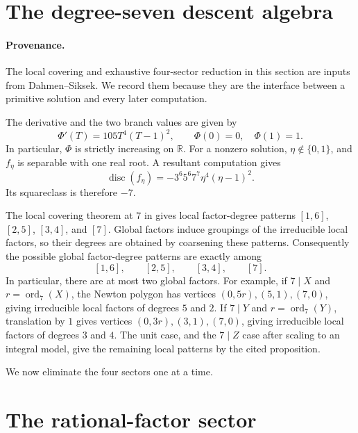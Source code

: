 \documentclass[11pt]{article}
\newcommand{\ord}{\operatorname{ord}}
\newcommand{\disc}{\operatorname{disc}}
\theoremstyle{definition}
\theoremstyle{remark}
\begin{document}
\section{The degree-seven descent algebra}\label{sec:descent}

\paragraph{Provenance.}
The local covering and exhaustive four-sector reduction in this section are
inputs from Dahmen--Siksek.  We record them because they are the
interface between a primitive solution and every later computation.

The derivative and the two branch values are given by
\begin{equation}\label{eq:derivative}
          \Phi'(T)=105T^4(T-1)^2,
          \qquad \Phi(0)=0,\quad \Phi(1)=1.
\end{equation}
In particular, $\Phi$ is strictly increasing on $\mathbb R$.  For a
nonzero solution, $\eta\notin\{0,1\}$, and $f_\eta$ is separable with one
real root.  A resultant computation gives
\begin{equation}\label{eq:discriminant}
 \disc(f_\eta)
   =-3^6 5^6 7^7\eta^4(\eta-1)^2.
\end{equation}
Its squareclass is therefore $-7$.

The local covering theorem at $7$ in \cite[Proposition~3.5]{DahmenSiksek}
gives local factor-degree patterns $[1,6]$, $[2,5]$, $[3,4]$, and $[7]$.
Global factors induce groupings of the irreducible local factors, so their
degrees are obtained by coarsening these patterns.  Consequently the
possible global factor-degree patterns are exactly among
\begin{equation}\label{eq:four-sectors}
                  [1,6],\qquad [2,5],\qquad [3,4],\qquad [7].
\end{equation}
In particular, there are at most two global factors.  For example, if
$7\mid X$ and $r=\ord_7(X)$, the Newton polygon has vertices
$(0,5r),(5,1),(7,0)$, giving irreducible local factors of degrees $5$ and $2$.
If $7\mid Y$ and $r=\ord_7(Y)$, translation by $1$ gives vertices
$(0,3r),(3,1),(7,0)$, giving irreducible local factors of degrees $3$ and $4$.
The unit case, and the $7\mid Z$ case after scaling to an integral model,
give the remaining local patterns by the cited proposition.

We now eliminate the four sectors one at a time.

\section{The rational-factor sector}
\end{document}
